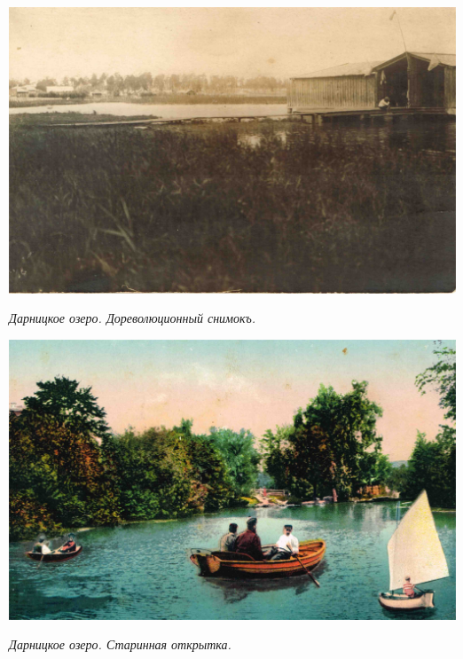 \begin{center}
\includegraphics[width=\linewidth]{lpix/darnickoe-ozero-dprev.jpg}

\textit{Дарницкое озеро. Дореволюционный снимокъ.}
\end{center}

\begin{center}
\includegraphics[width=\linewidth]{lpix/darn.jpg}

\textit{Дарницкое озеро. Старинная открытка.}
\end{center}

\vspace*{\fill}

\newpage

\vspace*{\fill}

